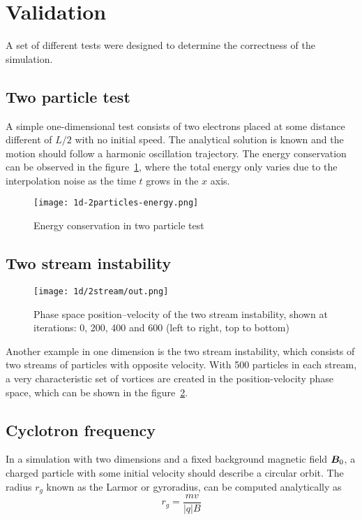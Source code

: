 \section{Validation}

A set of different tests were designed to determine the correctness of the
simulation.

\subsection{Two particle test}

A simple one-dimensional test consists of two electrons placed at some distance 
different of $L/2$ with no initial speed. The analytical solution is known and 
the motion should follow a harmonic oscillation trajectory. The energy 
conservation can be observed in the figure~\ref{fig:1d-2particles-energy}, where 
the total energy only varies due to the interpolation noise as the time $t$ 
grows in the $x$ axis.
%
\begin{figure}[h]
	\centering
	\texttt{[image: 1d-2particles-energy.png]}
	\caption{Energy conservation in two particle test}
	\label{fig:1d-2particles-energy}
\end{figure}

\subsection{Two stream instability}

%
\begin{figure}[ht]
	\centering
	\texttt{[image: 1d/2stream/out.png]}
	\caption{Phase space position--velocity of the two stream instability, shown 
	at iterations: 0, 200, 400 and 600 (left to right, top to bottom)}
	\label{fig:1d-2stream}
\end{figure}

Another example in one dimension is the two stream instability, which consists 
of two streams of particles with opposite velocity. With 500 particles in each 
stream, a very characteristic set of vortices are created in the 
position-velocity phase space, which can be shown in the 
figure~\ref{fig:1d-2stream}.

\subsection{Cyclotron frequency}

In a simulation with two dimensions and a fixed background magnetic field 
$\bm{B}_0$, a charged particle with some initial velocity should describe a circular 
orbit. The radius $r_g$ known as the Larmor or gyroradius, can be computed 
analytically as
\begin{equation}
r_g = \frac{m v}{|q| B}
\end{equation}
